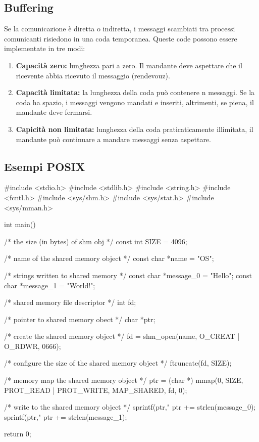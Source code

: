 \subsection{Buffering}
Se la comunicazione è diretta o indiretta, i messaggi scambiati tra processi comunicanti risiedono in una coda temporanea. 
Queste code possono essere implementate in tre modi:
\begin{enumerate}
  \item \textbf{Capacità zero:} lunghezza pari a zero. Il mandante deve aspettare che il ricevente abbia ricevuto il messaggio (rendevouz).
  \item \textbf{Capacità limitata:} la lunghezza della coda può contenere n messaggi. Se la coda ha spazio, i messaggi vengono mandati e inseriti, altrimenti, se piena, il mandante deve fermarsi.
  \item \textbf{Capicità non limitata:} lunghezza della coda praticaticamente illimitata, il mandante può continuare a mandare messaggi senza aspettare.
\end{enumerate}

\subsection{Esempi POSIX}
\begin{clang}
#include <stdio.h>
#include <stdlib.h>
#include <string.h>
#include <fcntl.h>
#include <sys/shm.h>
#include <sys/stat.h>
#include <sys/mman.h>

int main(){
  /* the size (in bytes) of shm obj */
  const int SIZE = 4096;

  /* name of the shared memory object */
  const char *name = "OS";

  /* strings written to shared memory */
  const char *message_0 = "Hello";
  const char *message_1 = "World!";


  /* shared memory file descriptor */
  int fd;

  /* pointer to shared memory obect */
  char *ptr;

  /* create the shared memory object */
  fd = shm_open(name, O_CREAT | O_RDWR, 0666);

  /* configure the size of the shared memory object */
  ftruncate(fd, SIZE);

  /* memory map the shared memory object */
  ptr = (char *)
  mmap(0, SIZE, PROT_READ | PROT_WRITE, MAP_SHARED, fd, 0);
  
  /* write to the shared memory object */
  sprintf(ptr,"%
  ptr += strlen(message_0);
  sprintf(ptr,"%
  ptr += strlen(message_1);
  
  return 0;
}
\end{clang}

